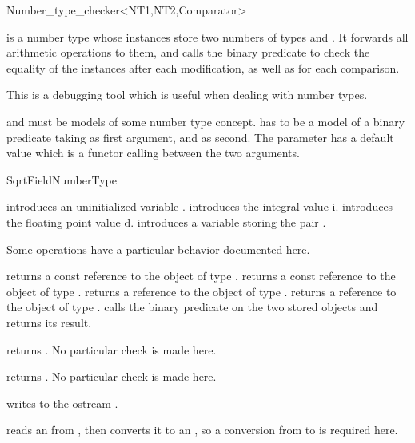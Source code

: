 
\begin{ccRefClass} {Number_type_checker<NT1,NT2,Comparator>}

\ccDefinition
{} is a number type whose instances store two numbers
of types  and .  It forwards all arithmetic operations to
them, and calls the binary predicate  to check the equality of
the instances after each modification, as well as for each comparison.

This is a debugging tool which is useful when dealing with number types.

\ccParameters

 and  must be models of some number type concept.
 has to be a model of a binary predicate taking 
as first argument, and  as second.  The  parameter
has a default value which is a functor calling  between
the two arguments.



\ccIsModel
SqrtFieldNumberType

\ccCreation
{}

{introduces an uninitialized variable \ccVar.}
\ccGlue
{}
{introduces the integral value i.}
\ccGlue
{}
{introduces the floating point value d.}
\ccGlue
{}
{introduces a variable storing the pair .}

\ccOperations

Some operations have a particular behavior documented here.

{returns a const reference to the object of type .}
\ccGlue
{}
{returns a const reference to the object of type .}
\ccGlue
{}
{returns a reference to the object of type .}
\ccGlue
{}
{returns a reference to the object of type .}
\ccGlue
{}
{calls the  binary predicate on the two stored objects
 and returns its result.}

{returns .  No particular check is made here.}

{returns .  No particular check is made here.}

{writes  to the ostream .}

{reads an  from , then converts it to an ,
 so a conversion from  to  is required here.}

\end{ccRefClass} 
